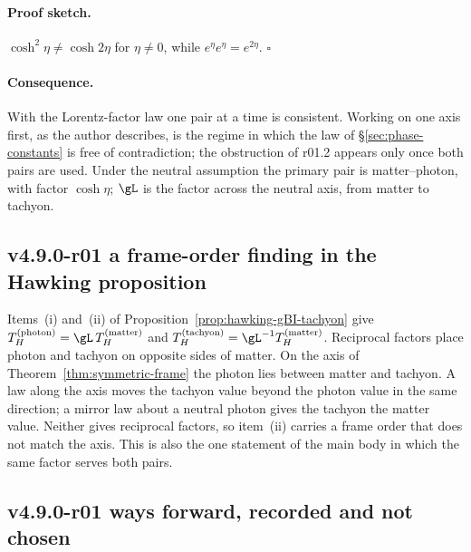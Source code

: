 \paragraph{Proof sketch.}
\(\cosh^2\eta\neq\cosh2\eta\) for \(\eta\neq0\), while \(e^{\eta}e^{\eta}=e^{2\eta}\).  \(\square\)

\paragraph{Consequence.}
With the Lorentz-factor law one pair at a time is consistent.  Working on one axis first, as the author describes, is the
regime in which the law of \S\ref{sec:phase-constants} is free of contradiction; the obstruction of r01.2 appears only
once both pairs are used.  Under the neutral assumption the primary pair is matter--photon, with factor \(\cosh\eta\);
\(\gL\) is the factor across the neutral axis, from matter to tachyon.

\subsection*{v4.9.0-r01 a frame-order finding in the Hawking proposition}
\label{subsec:v490-r01-hawking}

Items~(i) and~(ii) of Proposition~\ref{prop:hawking-gBI-tachyon} give \(T_H^{(\mathrm{photon})}=\gL\,T_H^{(\mathrm{matter})}\)
and \(T_H^{(\mathrm{tachyon})}=\gL^{-1}T_H^{(\mathrm{matter})}\).  Reciprocal factors place photon and tachyon on opposite
sides of matter.  On the axis of Theorem~\ref{thm:symmetric-frame} the photon lies between matter and tachyon.  A law along
the axis moves the tachyon value beyond the photon value in the same direction; a mirror law about a neutral photon gives
the tachyon the matter value.  Neither gives reciprocal factors, so item~(ii) carries a frame order that does not match the
axis.  This is also the one statement of the main body in which the same factor serves both pairs.

\subsection*{v4.9.0-r01 ways forward, recorded and not chosen}
\label{subsec:v490-r01-ways}

